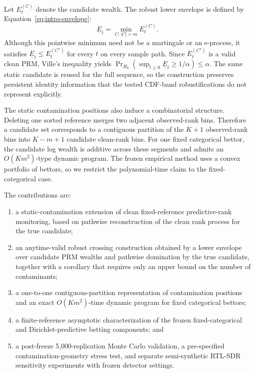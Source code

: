 Let \(E_t^{(C)}\) denote the candidate wealth. The robust lower envelope is defined by Equation~\eqref{eq:intro-envelope}:
\begin{equation}
  \underline E_t
  =
  \min_{C:|C|=m}E_t^{(C)}.
  \label{eq:intro-envelope}
\end{equation}
Although this pointwise minimum need not be a martingale or an e-process, it satisfies \(\underline E_t\le E_t^{(C^\star)}\) for every \(t\) on every sample path. Since \(E_t^{(C^\star)}\) is a valid clean PRM, Ville's inequality yields \(\Pr_{H_0}(\sup_{t\ge0}\underline E_t\ge1/\alpha)\le\alpha\).
The same static candidate is reused for the full sequence, so the construction preserves persistent identity information that the tested CDF-band robustifications do not represent explicitly.

The static contamination positions also induce a combinatorial structure. Deleting one sorted reference merges two adjacent observed-rank bins. Therefore a candidate set corresponds to a contiguous partition of the \(K+1\) observed-rank bins into \(K-m+1\) candidate clean-rank bins. For one fixed categorical bettor, the candidate log wealth is additive across these segments and admits an \(O(Km^2)\)-type dynamic program. The frozen empirical method uses a convex portfolio of bettors, so we restrict the polynomial-time claim to the fixed-categorical case.

The contributions are:
\begin{enumerate}[leftmargin=*]
  \item a static-contamination extension of clean fixed-reference predictive-rank monitoring, based on pathwise reconstruction of the clean rank process for the true candidate;
  \item an anytime-valid robust crossing construction obtained by a lower envelope over candidate PRM wealths and pathwise domination by the true candidate, together with a corollary that requires only an upper bound on the number of contaminants;
  \item a one-to-one contiguous-partition representation of contamination positions and an exact \(O(Km^2)\)-time dynamic program for fixed categorical bettors;
  \item a finite-reference asymptotic characterization of the frozen fixed-categorical and Dirichlet-predictive betting components; and
  \item a post-freeze 5,000-replication Monte Carlo validation, a pre-specified contamination-geometry stress test, and separate semi-synthetic RTL-SDR sensitivity experiments with frozen detector settings.
\end{enumerate}

